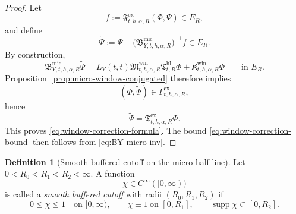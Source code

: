 \documentclass[11pt,a4paper]{amsart}
\theoremstyle{plain}
\theoremstyle{definition}
\newtheorem{definition}[theorem]{Definition}
\theoremstyle{remark}
\begin{document}
\begin{proof}
Let
\[
f:=\mathfrak F_{t,h,\alpha,R}^{\mathrm{ex}}(\Phi,\Psi)\in E_R,
\]
and define
\[
\widetilde\Psi
:=
\Psi
-
\bigl(
\mathfrak B_{Y,t,h,\alpha,R}^{\mathrm{mic}}
\bigr)^{-1}f
\in E_R.
\]
By construction,
\[
\mathfrak B_{Y,t,h,\alpha,R}^{\mathrm{mic}}\widetilde\Psi
=
L_Y(t,t)\mathfrak M_{t,h,\alpha,R}^{\mathrm{win}}
\mathfrak T_{t,R}^{\mathrm{hl}}\Phi
+
\mathfrak K_{t,h,\alpha,R}^{\mathrm{win}}\Phi
\qquad\text{in }E_R.
\]
Proposition~\ref{prop:micro-window-conjugated} therefore implies
\[
(\Phi,\widetilde\Psi)\in\Gamma_{t,h,\alpha,R}^{\mathrm{ex}},
\]
hence
\[
\widetilde\Psi=\mathfrak T_{t,h,\alpha,R}^{\mathrm{ex}}\Phi.
\]
This proves \eqref{eq:window-correction-formula}. The bound
\eqref{eq:window-correction-bound} then follows from
\eqref{eq:BY-micro-inv}.
\end{proof}

\begin{definition}[Smooth buffered cutoff on the micro half-line]
\label{def:micro-smooth-cutoff}
Let \(0<R_0<R_1<R_2<\infty\). A function
\[
\chi\in C^\infty([0,\infty))
\]
is called a \emph{smooth buffered cutoff} with radii \((R_0,R_1,R_2)\) if
\[
0\le \chi\le 1
\quad\text{on }[0,\infty),
\qquad
\chi\equiv1\ \text{on }[0,R_1],
\qquad
\operatorname{supp}\chi\subset [0,R_2].
\]
\end{definition}
\end{document}
